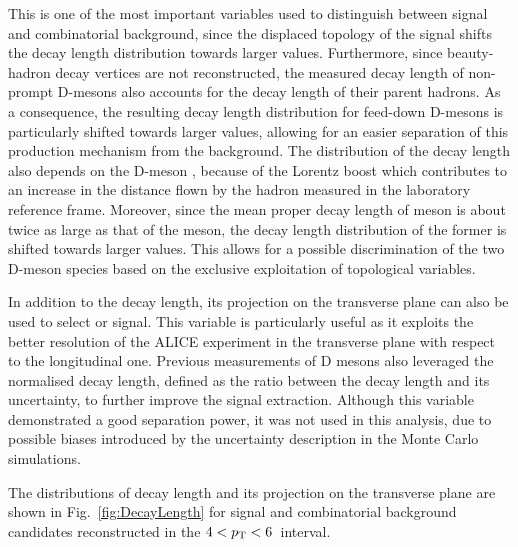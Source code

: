 This is one of the most important variables used to distinguish between signal and combinatorial background, since the displaced topology of the signal shifts the decay length distribution towards larger values. Furthermore, since beauty-hadron decay vertices are not reconstructed, the measured decay length of non-prompt D-mesons also accounts for the decay length of their parent hadrons. As a consequence, the resulting decay length distribution for feed-down D-mesons is particularly shifted towards larger values, allowing for an easier separation of this production mechanism from the background. The distribution of the decay length also depends on the D-meson \pt, because of the Lorentz boost which contributes to an increase in the distance flown by the hadron measured in the laboratory reference frame. Moreover, since the mean proper decay length of \dpl meson is about twice as large as that of the \ds meson, the decay length distribution of the former is shifted towards larger values. This allows for a possible discrimination of the two D-meson species based on the exclusive exploitation of topological variables.

In addition to the decay length, its projection on the transverse plane can also be used to select \ds or \dpl signal. This variable is particularly useful as it exploits the better resolution of the ALICE experiment in the transverse plane with respect to the longitudinal one. Previous measurements of D mesons also leveraged the normalised decay length, defined as the ratio between the decay length and its uncertainty, to further improve the signal extraction. Although this variable demonstrated a good separation power, it was not used in this analysis, due to possible biases introduced by the uncertainty description in the Monte Carlo simulations.

The distributions of decay length and its projection on the transverse plane are shown in Fig.~\ref{fig:DecayLength} for signal and combinatorial background candidates reconstructed in the $4 < p_\mathrm{T} < 6$~\gevc interval. 

